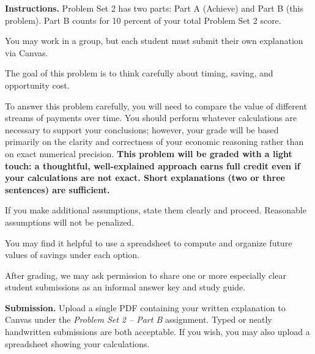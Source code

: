 \documentclass[12pt]{article}
\begin{document}
\noindent\textbf{Instructions.} Problem Set 2 has two parts: Part A (Achieve) and Part B (this problem). Part B counts for 10 percent of your total Problem Set 2 score.

You may work in a group, but each student must submit their own explanation via Canvas.

The goal of this problem is to think carefully about timing, saving, and opportunity cost.

To answer this problem carefully, you will need to compare the value of
different streams of payments over time. You should perform whatever
calculations are necessary to support your conclusions; however, your grade will be based primarily on the clarity and correctness of your economic reasoning rather than on exact numerical precision. \textbf{This problem will be graded with a light touch: a thoughtful, well-explained approach earns full credit even if your calculations are not exact. Short explanations (two or three sentences) are sufficient.}

If you make additional assumptions, state them clearly and proceed.
Reasonable assumptions will not be penalized.

You may find it helpful to use a spreadsheet to compute and organize future
values of savings under each option.

After grading, we may ask permission to share one or more especially clear
student submissions as an informal answer key and study guide.

\noindent\textbf{Submission.}
Upload a single PDF containing your written explanation to Canvas under the
\emph{Problem Set 2 -- Part B} assignment. Typed or neatly handwritten submissions are both acceptable. If you wish, you may also upload a spreadsheet showing your calculations.
\end{document}
